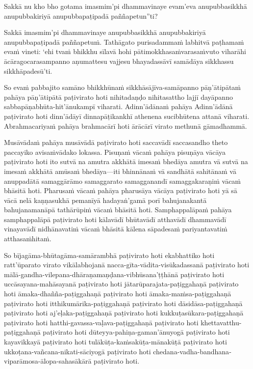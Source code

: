 \suttaRef{[MN 27 / 38 / 51]}

Sakkā nu kho bho gotama imasmim'pi dhammavinaye evam'eva anupubbasikkhā anupubbakiriyā anupubbapaṭipadā paññapetun''ti?

Sakkā imasmim'pi dhammavinaye anupubbasikkhā anupubbakiriyā anupubbapaṭipadā paññapetuṁ. Tathāgato purisadammaṁ labhitvā paṭhamaṁ evaṁ vineti: `ehi tvaṁ bhikkhu sīlavā hohi pātimokkhasaṁvarasaṁvuto viharāhi ācāragocarasampanno aṇumattesu vajjesu bhayadassāvī samādāya sikkhassu sikkhāpadesū'ti.

\suttaRef{[MN 107]}

So evaṁ pabbajito samāno bhikkhūnaṁ sikkhāsājīva-samāpanno pāṇ'ātipātaṁ pahāya pāṇ'ātipātā paṭivirato hoti nihitadaṇḍo nihitasattho lajjī dayāpanno sabbapāṇabhūta-hit'ānukampī viharati. Adinn'ādānaṁ pahāya Adinn'ādānā paṭivirato hoti dinn'ādāyī dinnapāṭikankhī athenena sucibhūtena attanā viharati. Abrahmacariyaṁ pahāya brahmacārī hoti ārācārī virato methunā gāmadhammā.

Musāvādaṁ pahāya musāvādā paṭivirato hoti saccavādī saccasandho theto paccayiko avisaṁvādako lokassa. Pisuṇaṁ vācaṁ pahāya pisuṇāya vācāya paṭivirato hoti ito sutvā na amutra akkhātā imesaṁ bhedāya amutra vā sutvā na imesaṁ akkhātā amūsaṁ bhedāya—iti bhinnānaṁ vā sandhātā sahitānaṁ vā anuppadātā samaggārāmo samaggarato samagganandī samaggakaraṇiṁ vācaṁ bhāsitā hoti. Pharusaṁ vācaṁ pahāya pharusāya vācāya paṭivirato hoti yā sā vācā nelā kaṇṇasukhā pemanīyā hadayaṅ'gamā porī bahujanakantā bahujanamanāpā tathārūpiṁ vācaṁ bhāsitā hoti. Samphappalāpaṁ pahāya samphappalāpā paṭivirato hoti kālavādī bhūtavādī atthavādī dhammavādī vinayavādī nidhānavatiṁ vācaṁ bhāsitā kālena sāpadesaṁ pariyantavatiṁ atthasaṁhitaṁ.

So bījagāma-bhūtagāma-samārambhā paṭivirato hoti ekabhattiko hoti ratt'ūparato virato vikālabhojanā nacca-gīta-vādita-visūkadassanā paṭivirato hoti mālā­-gandha-vilepana­-dhāraṇa­maṇḍana­-vibhūsana'ṭṭhānā paṭivirato hoti uccāsayana-mahāsayanā paṭivirato hoti jātarūparajata-paṭiggahaṇā paṭivirato hoti āmaka-dhañña-paṭiggahaṇā paṭivirato hoti āmaka-maṁsa-paṭiggahaṇā paṭivirato hoti itthikumārika-paṭiggahaṇā paṭivirato hoti dāsidāsa-paṭiggahaṇā paṭivirato hoti aj'eḷaka-paṭiggahaṇā paṭivirato hoti kukkuṭasūkara-paṭiggahaṇā paṭivirato hoti hatthi-gavassa-vaḷava-paṭiggahaṇā paṭivirato hoti khettavatthu-paṭiggahaṇā paṭivirato hoti dūteyya-pahiṇa-gaman'ānuyogā paṭivirato hoti kayavikkayā paṭivirato hoti tulākūṭa-kaṁsakūṭa-mānakūṭā paṭivirato hoti ukkoṭana-vañcana-nikati-sāciyogā paṭivirato hoti chedana-­vadha-bandhana­ viparāmosa-ālopa-sahasākārā paṭivirato hoti.

